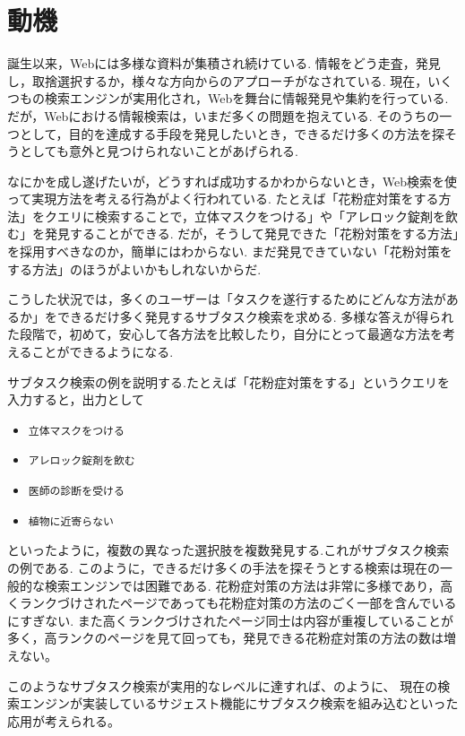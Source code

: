 \documentclass[submit,techreq]{ipsj}
\def\|{\verb|}
\begin{document}
%1
\section{動機}

誕生以来，Webには多様な資料が集積され続けている. 情報をどう走査，発見し，取捨選択するか，様々な方向からのアプローチがなされている. 
現在，いくつもの検索エンジンが実用化され，Webを舞台に情報発見や集約を行っている. だが，Webにおける情報検索は，いまだ多くの問題を抱えている. 
そのうちの一つとして，目的を達成する手段を発見したいとき，できるだけ多くの方法を探そうとしても意外と見つけられないことがあげられる.


なにかを成し遂げたいが，どうすれば成功するかわからないとき，Web検索を使って実現方法を考える行為がよく行われている. たとえば「花粉症対策をする方法」をクエリに検索することで，立体マスクをつける」や「アレロック錠剤を飲む」を発見することができる. だが，そうして発見できた「花粉対策をする方法」を採用すべきなのか，簡単にはわからない. まだ発見できていない「花粉対策をする方法」のほうがよいかもしれないからだ.


こうした状況では，多くのユーザーは「タスクを遂行するためにどんな方法があるか」をできるだけ多く発見するサブタスク検索を求める. 多様な答えが得られた段階で，初めて，安心して各方法を比較したり，自分にとって最適な方法を考えることができるようになる.

サブタスク検索の例を説明する.たとえば「花粉症対策をする」というクエリを入力すると，出力として


\begin{itemize}
\item \|立体マスクをつける|
\item \|アレロック錠剤を飲む|
\item \|医師の診断を受ける|
\item \|植物に近寄らない|
\end{itemize}


といったように，複数の異なった選択肢を複数発見する.これがサブタスク検索の例である. このように，できるだけ多くの手法を探そうとする検索は現在の一般的な検索エンジンでは困難である. 花粉症対策の方法は非常に多様であり，高くランクづけされたページであっても花粉症対策の方法のごく一部を含んでいるにすぎない. また高くランクづけされたページ同士は内容が重複していることが多く，高ランクのページを見て回っても，発見できる花粉症対策の方法の数は増えない。

このようなサブタスク検索が実用的なレベルに達すれば、のように、 現在の検索エンジンが実装しているサジェスト機能にサブタスク検索を組み込むといった応用が考えられる。
\end{document}
